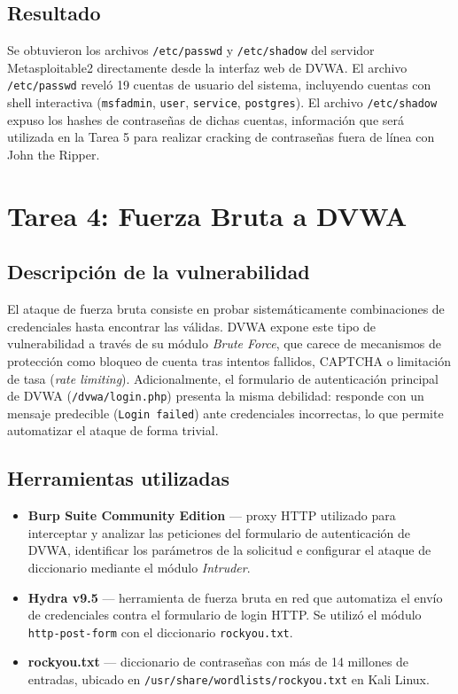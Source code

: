 \documentclass[12pt, letterpaper]{article}
\begin{document}
\subsection{Resultado}

Se obtuvieron los archivos \texttt{/etc/passwd} y \texttt{/etc/shadow} del servidor Metasploitable2 directamente desde la interfaz web de DVWA. El archivo \texttt{/etc/passwd} reveló 19 cuentas de usuario del sistema, incluyendo cuentas con shell interactiva (\texttt{msfadmin}, \texttt{user}, \texttt{service}, \texttt{postgres}). El archivo \texttt{/etc/shadow} expuso los hashes de contraseñas de dichas cuentas, información que será utilizada en la Tarea 5 para realizar cracking de contraseñas fuera de línea con John the Ripper.

\section{Tarea 4: Fuerza Bruta a DVWA}

\subsection{Descripción de la vulnerabilidad}

El ataque de fuerza bruta consiste en probar sistemáticamente combinaciones de credenciales hasta encontrar las válidas. DVWA expone este tipo de vulnerabilidad a través de su módulo \textit{Brute Force}, que carece de mecanismos de protección como bloqueo de cuenta tras intentos fallidos, CAPTCHA o limitación de tasa (\textit{rate limiting}). Adicionalmente, el formulario de autenticación principal de DVWA (\texttt{/dvwa/login.php}) presenta la misma debilidad: responde con un mensaje predecible (\texttt{Login failed}) ante credenciales incorrectas, lo que permite automatizar el ataque de forma trivial.

\subsection{Herramientas utilizadas}

\begin{itemize}
    \item \textbf{Burp Suite Community Edition} — proxy HTTP utilizado para interceptar y analizar las peticiones del formulario de autenticación de DVWA, identificar los parámetros de la solicitud e configurar el ataque de diccionario mediante el módulo \textit{Intruder}.
    \item \textbf{Hydra v9.5} — herramienta de fuerza bruta en red que automatiza el envío de credenciales contra el formulario de login HTTP. Se utilizó el módulo \texttt{http-post-form} con el diccionario \texttt{rockyou.txt}.
    \item \textbf{rockyou.txt} — diccionario de contraseñas con más de 14 millones de entradas, ubicado en \texttt{/usr/share/wordlists/rockyou.txt} en Kali Linux.
\end{itemize}
\end{document}
